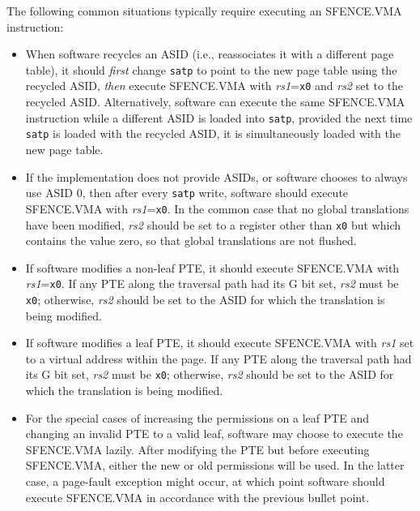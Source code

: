 \begin{commentary}
The following common situations typically require executing an
SFENCE.VMA instruction:

\vspace{-0.1in}
\begin{itemize}

\item When software recycles an ASID (i.e., reassociates it with a different
page table), it should {\em first} change {\tt satp} to point to the new page
table using the recycled ASID, {\em then} execute SFENCE.VMA with {\em
rs1}={\tt x0} and {\em rs2} set to the recycled ASID.  Alternatively, software
can execute the same SFENCE.VMA instruction while a different ASID is loaded
into {\tt satp}, provided the next time {\tt satp} is loaded with the recycled
ASID, it is simultaneously loaded with the new page table.

\item If the implementation does not provide ASIDs, or software chooses to
always use ASID 0, then after every {\tt satp} write, software should execute
SFENCE.VMA with {\em rs1}={\tt x0}.  In the common case that no global
translations have been modified, {\em rs2} should be set to a register other than
{\tt x0} but which contains the value zero, so that global translations are
not flushed.

\item If software modifies a non-leaf PTE, it should execute SFENCE.VMA with
{\em rs1}={\tt x0}.  If any PTE along the traversal path had its G bit set,
{\em rs2} must be {\tt x0}; otherwise, {\em rs2} should be set to the ASID for
which the translation is being modified.

\item If software modifies a leaf PTE, it should execute SFENCE.VMA with {\em
rs1} set to a virtual address within the page.  If any PTE along the traversal
path had its G bit set, {\em rs2} must be {\tt x0}; otherwise, {\em rs2}
should be set to the ASID for which the translation is being modified.

\item For the special cases of increasing the permissions on a leaf PTE and
changing an invalid PTE to a valid leaf, software may choose to execute
the SFENCE.VMA lazily.  After modifying the PTE but before executing
SFENCE.VMA, either the new or old permissions will be used.  In the latter
case, a page-fault exception might occur, at which point software should
execute SFENCE.VMA in accordance with the previous bullet point.

\end{itemize}
\end{commentary}

